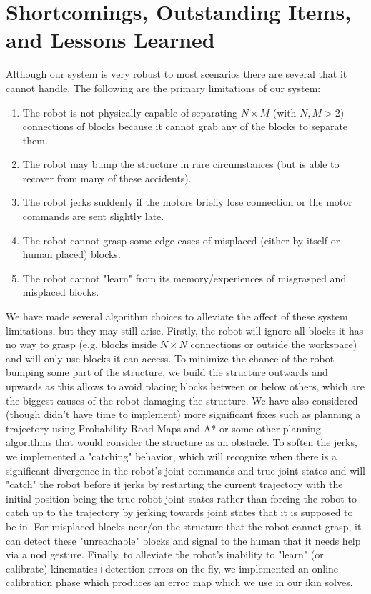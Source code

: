 \section{Shortcomings, Outstanding Items, and Lessons Learned}

\noindent Although our system is very robust to most scenarios there are several that it cannot handle. The following are the primary limitations of our system:

\begin{enumerate}
    \item The robot is not physically capable of separating $N\times M$ (with $N,M>2$) connections of blocks because it cannot grab any of the blocks to separate them.
    \item The robot may bump the structure in rare circumstances (but is able to recover from many of these accidents).
    \item The robot jerks suddenly if the motors briefly lose connection or the motor commands are sent slightly late.
    \item The robot cannot grasp some edge cases of misplaced (either by itself or human placed) blocks.
    \item The robot cannot "learn" from its memory/experiences of misgrasped and misplaced blocks.
\end{enumerate}

\noindent We have made several algorithm choices to alleviate the affect of these system limitations, but they may still arise. Firstly, the robot will ignore all blocks it has no way to grasp (e.g. blocks inside $N\times N$ connections or outside the workspace) and will only use blocks it can access. To minimize the chance of the robot bumping some part of the structure, we build the structure outwards and upwards as this allows to avoid placing blocks between or below others, which are the biggest causes of the robot damaging the structure. We have also considered (though didn't have time to implement) more significant fixes such as planning a trajectory using Probability Road Maps and A* or some other planning algorithms that would consider the structure as an obstacle. To soften the jerks, we implemented a "catching" behavior, which will recognize when there is a significant divergence in the robot's joint commands and true joint states and will "catch" the robot before it jerks by restarting the current trajectory with the initial position being the true robot joint states rather than forcing the robot to catch up to the trajectory by jerking towards joint states that it is supposed to be in. For misplaced blocks near/on the structure that the robot cannot grasp, it can detect these "unreachable" blocks and signal to the human that it needs help via a nod gesture. Finally, to alleviate the robot's inability to "learn" (or calibrate) kinematics+detection errors on the fly, we implemented an online calibration phase which produces an error map which we use in our ikin solves. 

